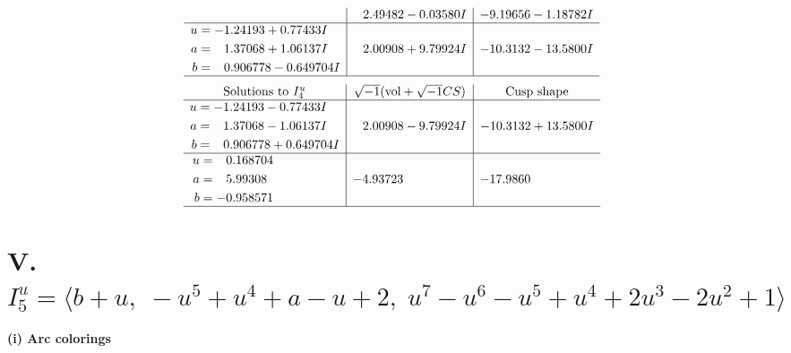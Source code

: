 \documentclass[1p]{elsarticle_modified}
\theoremstyle{definition}
\newcommand{\I}{\sqrt{-1}}
\begin{document}
$$\begin{array}{c|c|c}
 & \phantom{-}2.49482 - 0.03580 I & -9.19656 - 1.18782 I \\ \hline\begin{aligned}
u &= -1.24193 + 0.77433 I \\
a &= \phantom{-}1.37068 + 1.06137 I \\
b &= \phantom{-}0.906778 - 0.649704 I\end{aligned}
 & \phantom{-}2.00908 + 9.79924 I & -10.3132 - 13.5800 I\\
 \hline 
 \end{array}$$\newpage$$\begin{array}{c|c|c}  
\text{Solutions to }I^u_{4}& \I (\text{vol} + \sqrt{-1}CS) & \text{Cusp shape}\\
 \hline 
\begin{aligned}
u &= -1.24193 - 0.77433 I \\
a &= \phantom{-}1.37068 - 1.06137 I \\
b &= \phantom{-}0.906778 + 0.649704 I\end{aligned}
 & \phantom{-}2.00908 - 9.79924 I & -10.3132 + 13.5800 I \\ \hline\begin{aligned}
u &= \phantom{-}0.168704\phantom{ +0.000000I} \\
a &= \phantom{-}5.99308\phantom{ +0.000000I} \\
b &= -0.958571\phantom{ +0.000000I}\end{aligned}
 & -4.93723\phantom{ +0.000000I} & -17.9860\phantom{ +0.000000I}\\
 \hline 
 \end{array}$$\newpage\newpage\renewcommand{\arraystretch}{1}
\centering \section*{V. $I^u_{5}= \langle b+u,\;- u^5+u^4+a- u+2,\;u^7- u^6- u^5+u^4+2 u^3-2 u^2+1 \rangle$}
\flushleft \textbf{(i) Arc colorings}\\
\end{document}
